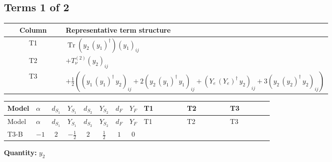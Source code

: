 \documentclass[8pt]{article}
\begin{document}
\begin{landscape}
\subsection*{Terms 1 of 2}
\begin{center}
\begin{tabular}{@{}c >{\raggedright\arraybackslash}p{0.82\linewidth}@{}}
\toprule
Column & Representative term structure \\
\midrule
T1 & \(\displaystyle \operatorname{Tr}\!\left({y_2}\,\left({y_1}\right)^{\dagger}\right) \left({y_1}\right)_{ij}\) \\
\midrule
T2 & \(\displaystyle +T_{\nu}^{(2)} \left({y_2}\right)_{ij}\) \\
\midrule
T3 & \(\displaystyle +\frac{1}{2} (\left({y_1}\,\left({y_1}\right)^{\dagger}\,{y_2}\right)_{ij}+2 \left({y_2}\,\left({y_1}\right)^{\dagger}\,{y_1}\right)_{ij}+\left({Y_e}\,\left({Y_e}\right)^{\dagger}\,{y_2}\right)_{ij}+3 \left({y_2}\,\left({y_2}\right)^{\dagger}\,{y_2}\right)_{ij})\) \\
\midrule
\bottomrule
\end{tabular}
\end{center}
\smallskip
\tiny
\begin{longtable}{@{}llcccccc >{\raggedright\arraybackslash}p{0.21\linewidth} >{\raggedright\arraybackslash}p{0.21\linewidth} >{\raggedright\arraybackslash}p{0.21\linewidth}@{}}
\toprule
Model & $\alpha$ & $d_{S_1}$ & $Y_{S_1}$ & $d_{S_2}$ & $Y_{S_2}$ & $d_F$ & $Y_F$ & T1 & T2 & T3 \\
\midrule
\endfirsthead
\toprule
Model & $\alpha$ & $d_{S_1}$ & $Y_{S_1}$ & $d_{S_2}$ & $Y_{S_2}$ & $d_F$ & $Y_F$ & T1 & T2 & T3 \\
\midrule
\endhead
T3-B & $-1$ & $2$ & $-\frac{1}{2}$ & $2$ & $\frac{1}{2}$ & $1$ & $0$ & \scriptsize\adjustbox{max width=\linewidth}{$\begin{gathered} \operatorname{Tr}\!\left({y_2}\,\left({y_1}\right)^{\dagger}\right) \left({y_1}\right)_{ij}\end{gathered}$} & \scriptsize\adjustbox{max width=\linewidth}{$\begin{gathered} +T_{\nu}^{(2)} \left({y_2}\right)_{ij}\end{gathered}$} & \scriptsize\adjustbox{max width=\linewidth}{$\begin{gathered} +\frac{1}{2} (\left({y_1}\,\left({y_1}\right)^{\dagger}\,{y_2}\right)_{ij}+2 \left({y_2}\,\left({y_1}\right)^{\dagger}\,{y_1}\right)_{ij}+\left({Y_e}\,\left({Y_e}\right)^{\dagger}\,{y_2}\right)_{ij}+3 \left({y_2}\,\left({y_2}\right)^{\dagger}\,{y_2}\right)_{ij})\end{gathered}$} \\
\midrule
\bottomrule
\end{longtable}
\clearpage
\noindent\textbf{Quantity: }$y_2$\par\smallskip

\end{landscape}
\end{document}
